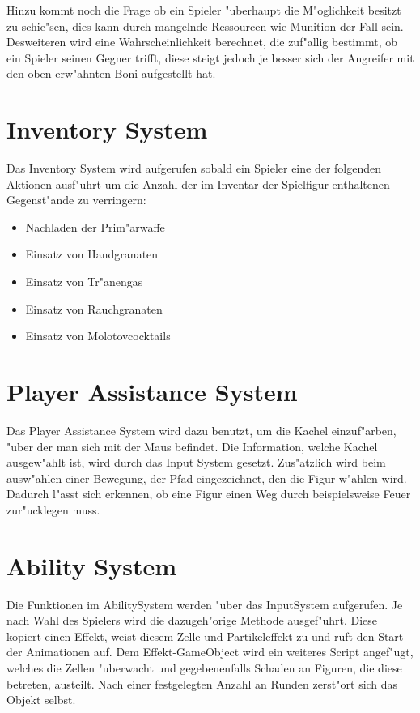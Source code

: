 Hinzu kommt noch die Frage ob ein Spieler "uberhaupt die M"oglichkeit besitzt zu schie"sen, dies kann durch mangelnde Ressourcen wie Munition der Fall sein.
Desweiteren wird eine Wahrscheinlichkeit berechnet, die zuf"allig bestimmt, ob ein Spieler seinen Gegner trifft, diese steigt jedoch je besser sich der Angreifer mit den oben erw"ahnten Boni aufgestellt hat.


\section{Inventory System}

Das Inventory System wird aufgerufen sobald ein Spieler eine der folgenden Aktionen ausf"uhrt um die Anzahl der im Inventar der Spielfigur enthaltenen Gegenst"ande zu verringern:\newline


\begin{itemize}
	\item Nachladen der Prim"arwaffe
	\item Einsatz von Handgranaten
	\item Einsatz von Tr"anengas
	\item Einsatz von Rauchgranaten
	\item Einsatz von Molotovcocktails
\end{itemize}





\section{Player Assistance System}
Das Player Assistance System wird dazu benutzt, um die Kachel einzuf"arben, "uber der man sich mit der Maus befindet. Die Information, welche Kachel ausgew"ahlt ist, wird durch das Input System gesetzt.
Zus"atzlich wird beim ausw"ahlen einer Bewegung, der Pfad eingezeichnet, den die Figur w"ahlen wird.
Dadurch l"asst sich erkennen, ob eine Figur einen Weg durch beispielsweise Feuer zur"ucklegen muss.


\section{Ability System}
Die Funktionen im AbilitySystem werden "uber das InputSystem aufgerufen. Je nach Wahl des Spielers wird die dazugeh"orige Methode ausgef"uhrt. Diese kopiert einen Effekt, weist diesem Zelle und Partikeleffekt zu und ruft den Start der Animationen auf. Dem Effekt-GameObject wird ein weiteres Script angef"ugt, welches die Zellen "uberwacht und gegebenenfalls Schaden an Figuren, die diese betreten, austeilt. Nach einer festgelegten Anzahl an Runden zerst"ort sich das Objekt selbst.


